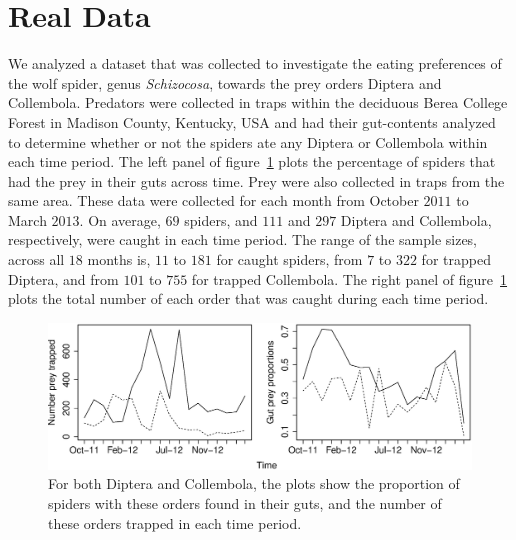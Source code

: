 \section{Real Data}
\label{sec:data}

We analyzed a dataset that was collected to investigate the eating preferences of the wolf spider, genus \textit{Schizocosa}, towards the prey orders Diptera and Collembola.  Predators were collected in traps within the deciduous Berea College Forest in Madison County, Kentucky, USA and had their gut-contents analyzed to determine whether or not the spiders ate any Diptera or Collembola within each time period.  The left panel of figure~\ref{fig:data} plots the percentage of spiders that had the prey in their guts across time.  Prey were also collected in traps from the same area.  These data were collected for each month from October $2011$ to March $2013$.  On average, $69$ spiders, and $111$ and $297$ Diptera and Collembola, respectively, were caught in each time period.  The range of the sample sizes, across all $18$ months is, $11$ to $181$ for caught spiders, from $7$ to $322$ for trapped Diptera, and from $101$ to $755$ for trapped Collembola.  The right panel of figure~\ref{fig:data} plots the total number of each order that was caught during each time period. 

\begin{figure}
  \centering
  \includegraphics[scale=0.5]{data}
  \caption{For both Diptera and Collembola, the plots show the proportion of spiders with these orders found in their guts, and the number of these orders trapped in each time period.}
  \label{fig:data}
\end{figure}


